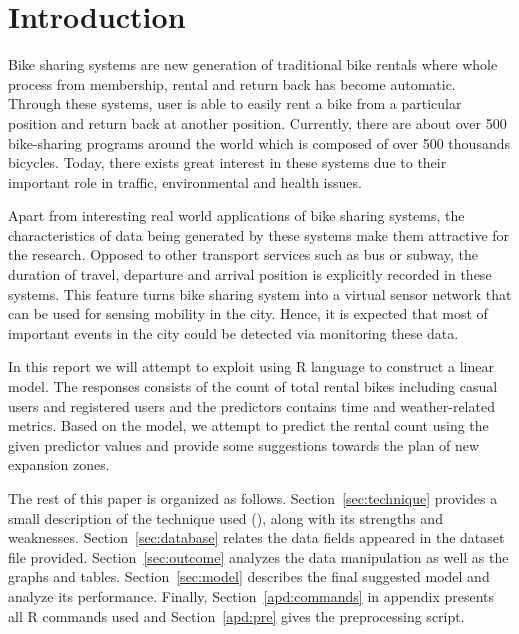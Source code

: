 \section{Introduction}
\label{sec:intro}
Bike sharing systems are new generation of traditional bike rentals where whole process from membership, rental and return
back has become automatic. Through these systems, user is able to easily rent a bike from a particular position and return
back at another position. Currently, there are about over 500 bike-sharing programs around the world which is composed of
over 500 thousands bicycles. Today, there exists great interest in these systems due to their important role in traffic,
environmental and health issues.

Apart from interesting real world applications of bike sharing systems, the characteristics of data being generated by
these systems make them attractive for the research. Opposed to other transport services such as bus or subway, the duration
of travel, departure and arrival position is explicitly recorded in these systems. This feature turns bike sharing system into
a virtual sensor network that can be used for sensing mobility in the city. Hence, it is expected that most of important
events in the city could be detected via monitoring these data.

In this report we will attempt to exploit {\mlr} using R language to construct a linear model. The responses consists of the count of total rental bikes including casual users and registered users and the predictors contains time and weather-related metrics. Based on the model, we attempt to predict the rental count using the given predictor values and provide some suggestions towards the plan of new expansion zones.

The rest of this paper is organized as follows. Section~\ref{sec:technique} provides a small description of the technique used (\mlr), along with its strengths and weaknesses.
Section~\ref{sec:database} relates the data fields appeared in the dataset file provided. Section~\ref{sec:outcome} analyzes the data manipulation as well as the graphs and tables. Section~\ref{sec:model} describes the final suggested model and analyze its performance. Finally, Section~\ref{apd:commands} in appendix presents all R commands used and Section~\ref{apd:pre} gives the preprocessing script. 